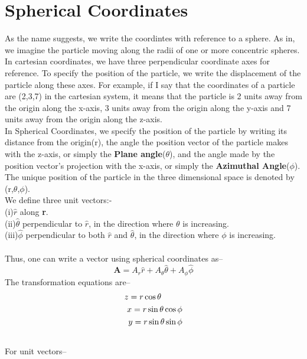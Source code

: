 \documentclass[12pt]{article}
\begin{document}
\section{Spherical Coordinates}
As the name suggests, we write the coordintes with reference to a sphere. As in, we imagine the particle moving along the radii of one or more concentric
spheres. \\
In cartesian coordinates, we have three perpendicular coordinate axes for reference. To specify the position of the particle, we write the displacement of the particle along these axes.
For example, if I say that the coordinates of a particle are (2,3,7) in the cartesian system, it means that the particle is 2 units away from the origin along the x-axis, 3 units away from the 
origin along the y-axis and 7 units away from the origin along the z-axis. \\
In Spherical Coordinates, we specify the position of the particle by writing its distance from the origin(r), the angle the position vector of the particle makes with the z-axis, or simply the \textbf{Plane angle}($\theta$), and the
angle made by the position vector's projection with the x-axis, or simply the \textbf{Azimuthal Angle}($\phi$). \\
The unique position of the particle in the three dimensional space is denoted by (r,$\theta$,$\phi$). \\
We define three unit vectors:-\\
(i)$\hat{r}$ along \textbf{r}. \\
(ii)$\hat{\theta}$ perpendicular to $\hat{r}$, in the direction where $\theta$ is increasing. \\ 
(iii)$\hat{\phi}$ perpendicular to both $\hat{r}$ and $\hat{\theta}$, in the direction where $\phi$ is increasing. \\ \\
Thus, one can write a vector using spherical coordinates as--
\begin{equation}
    \mathbf{A}=A_r\hat{r}+A_{\theta}\hat{\theta}+A_{\phi}\hat{\phi}
\end{equation}
The transformation equations are--
\begin{align}
    z = r\cos\theta \hspace{0.9cm}\\
    x = r\sin\theta\cos\phi \\
    y = r\sin\theta\sin\phi \\ \notag
\end{align}
For unit vectors--
\end{document}
